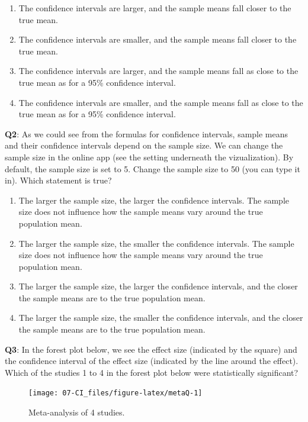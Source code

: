 \documentclass[
  oneside]{krantz}
\providecommand{\tightlist}{%
  \setlength{\itemsep}{0pt}\setlength{\parskip}{0pt}}
\begin{document}
\begin{enumerate}
\def\labelenumi{\Alph{enumi})}
\tightlist
\item
  The confidence intervals are larger, and the sample means fall closer to the true mean.
\item
  The confidence intervals are smaller, and the sample means fall closer to the true mean.
\item
  The confidence intervals are larger, and the sample means fall as close to the true mean as for a 95\% confidence interval.
\item
  The confidence intervals are smaller, and the sample means fall as close to the true mean as for a 95\% confidence interval.
\end{enumerate}

\textbf{Q2}: As we could see from the formulas for confidence intervals, sample means and their confidence intervals depend on the sample size. We can change the sample size in the online app (see the setting underneath the vizualization). By default, the sample size is set to 5. Change the sample size to 50 (you can type it in). Which statement is true?

\begin{enumerate}
\def\labelenumi{\Alph{enumi})}
\tightlist
\item
  The larger the sample size, the larger the confidence intervals. The sample size does not influence how the sample means vary around the true population mean.
\item
  The larger the sample size, the smaller the confidence intervals. The sample size does not influence how the sample means vary around the true population mean.
\item
  The larger the sample size, the larger the confidence intervals, and the closer the sample means are to the true population mean.
\item
  The larger the sample size, the smaller the confidence intervals, and the closer the sample means are to the true population mean.
\end{enumerate}

\textbf{Q3}: In the forest plot below, we see the effect size (indicated by the square) and the confidence interval of the effect size (indicated by the line around the effect). Which of the studies 1 to 4 in the forest plot below were statistically significant?



\begin{figure}

{\centering \texttt{[image: 07-CI\_files/figure-latex/metaQ-1]} 

}

\caption{Meta-analysis of 4 studies.}\label{fig:metaQ}
\end{figure}
\end{document}
